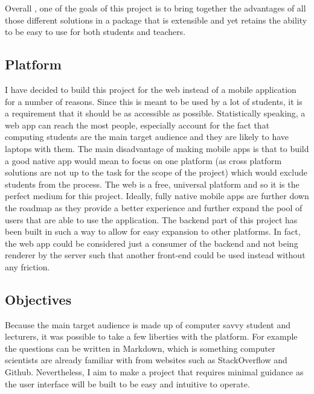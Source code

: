 \documentclass[11pt]{informatics-report}
\begin{document}
Overall , one of the goals of this project is to bring together the advantages of all those different solutions in a package that is extensible and yet retains the ability to be easy to use for both students and teachers.

\subsection{Platform}
I have decided to build this project for the web instead of a mobile application for a number of reasons. Since this is meant to be used by a lot of students, it is a requirement that it should be as accessible as possible. Statistically speaking, a web app can reach the most people, especially account for the fact that computing students are the main target audience and they are likely to have laptops with them.
The main disadvantage of making mobile apps is that to build a good native app would mean to focus on one platform (as cross platform solutions are not up to the task for the scope of the project) which would exclude students from the process. The web is a free, universal platform and so it is the perfect medium for this project.
Ideally, fully native mobile apps are further down the roadmap as they provide a better experience and further expand the pool of users that are able to use the application.
The backend part of this project has been built in such a way to allow for easy expansion to other platforms. In fact, the web app could be considered just a consumer of the backend and not being renderer by the server such that another front-end could be used instead without any friction.



\subsection{Objectives}
Because the main target audience is made up of computer savvy student and lecturers, it was possible to take a few liberties with the platform. For example the questions can be written in Markdown, which is something computer scientists are already familiar with from websites such as StackOverflow and Github.
Nevertheless, I aim to make a project that requires minimal guidance as the user interface will be built to be easy and intuitive to operate.
\end{document}
